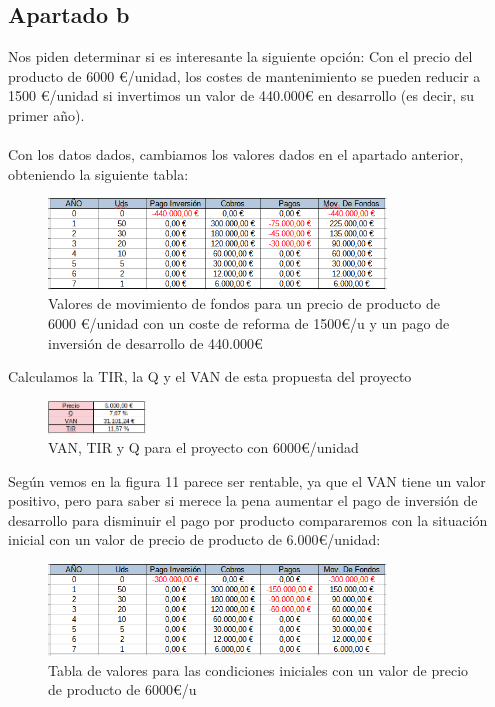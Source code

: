 \documentclass[11pt,letterpaper,onecolumn]{article}
\begin{document}
\subsection{Apartado b}
Nos piden determinar si es interesante la siguiente opción: Con el precio del producto de 6000 €/unidad, los costes de mantenimiento se pueden reducir a 1500 €/unidad si invertimos un valor de 440.000€ en desarrollo (es decir, su primer año). \\
\\
Con los datos dados, cambiamos los valores dados en el apartado anterior, obteniendo la siguiente tabla:
\begin{figure}[H]
	\centering
	\includegraphics[width=0.8\textwidth]{imagen/ej2b_mod.PNG}
	\caption{Valores de movimiento de fondos para un precio de producto de 6000 €/unidad con un coste de reforma de 1500€/u y un pago de inversión de desarrollo de 440.000€}
	\label{fig:imagen-ej2b_mod-PNG}
\end{figure}	
Calculamos la TIR, la Q y el VAN de esta propuesta del proyecto
\begin{figure}[H]
	\centering
	\includegraphics[width=0.23\textwidth]{imagen/ej2b_mod_VAN.png}
	\caption{VAN, TIR y Q para el proyecto con 6000€/unidad}
	\label{fig:imagen-ej2b_mod_VAN-png}
\end{figure}
Según vemos en la figura 11 parece ser rentable, ya que el VAN tiene un valor positivo, pero para saber si merece la pena aumentar el pago de inversión de desarrollo para disminuir el pago por producto compararemos con la situación inicial con un valor de precio de producto de 6.000€/unidad:
\begin{figure}[H]
	\centering
	\includegraphics[width=0.8\textwidth]{imagen/ej2b_or.PNG}
	\caption{Tabla de valores para las condiciones iniciales con un valor de precio de producto de 6000€/u}
	\label{fig:imagen-ej2b_or-PNG}
\end{figure}
\end{document}
